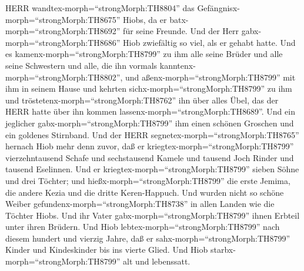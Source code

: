 HERR wandtex-morph=``strongMorph:TH8804'' das
Gefängnisx-morph=``strongMorph:TH8675'' Hiobs, da er
batx-morph=``strongMorph:TH8692'' für seine Freunde. Und der Herr
gabx-morph=``strongMorph:TH8686'' Hiob zwiefältig so viel, als er gehabt
hatte.  Und es kamenx-morph=``strongMorph:TH8799'' zu ihm
alle seine Brüder und alle seine Schwestern und alle, die ihn vormals
kanntenx-morph=``strongMorph:TH8802'', und
aßenx-morph=``strongMorph:TH8799'' mit ihm in seinem Hause und kehrten
sichx-morph=``strongMorph:TH8799'' zu ihm und
tröstetenx-morph=``strongMorph:TH8762'' ihn über alles Übel, das der
HERR hatte über ihn kommen lassenx-morph=``strongMorph:TH8689''. Und ein
jeglicher gabx-morph=``strongMorph:TH8799'' ihm einen schönen Groschen
und ein goldenes Stirnband.  Und der HERR
segnetex-morph=``strongMorph:TH8765'' hernach Hiob mehr denn zuvor, daß
er kriegtex-morph=``strongMorph:TH8799'' vierzehntausend Schafe und
sechstausend Kamele und tausend Joch Rinder und tausend Eselinnen.
 Und er kriegtex-morph=``strongMorph:TH8799'' sieben Söhne
und drei Töchter;  und hießx-morph=``strongMorph:TH8799''
die erste Jemima, die andere Kezia und die dritte Keren-Happuch.
 Und wurden nicht so schöne Weiber
gefundenx-morph=``strongMorph:TH8738'' in allen Landen wie die Töchter
Hiobs. Und ihr Vater gabx-morph=``strongMorph:TH8799'' ihnen Erbteil
unter ihren Brüdern.  Und Hiob
lebtex-morph=``strongMorph:TH8799'' nach diesem hundert und vierzig
Jahre, daß er sahx-morph=``strongMorph:TH8799'' Kinder und Kindeskinder
bis ins vierte Glied.  Und Hiob
starbx-morph=``strongMorph:TH8799'' alt und lebenssatt.
